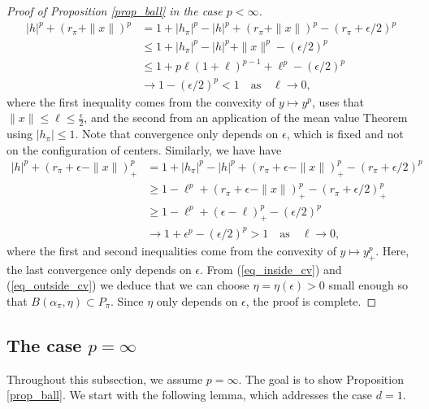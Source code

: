 \documentclass[a4paper, 11pt]{article}
\theoremstyle{plain}
\theoremstyle{definition}
\numberwithin{equation}{section}
\begin{document}
\begin{proof}[Proof of Proposition \ref{prop_ball} in the case $p<\infty$]
        \begin{equation}
            \label{eq_inside_cv}
            \begin{split}
                |h|^p+(r_\pi+\|x\|)^p&=1+|{h_\pi}|^p-|h|^p+(r_\pi+\|x\|)^p-(r_\pi+\epsilon/2)^p\\
                &\leq 1+|{h_\pi}|^p-|h|^p+\|x\|^p-(\epsilon/2)^p\\
                &\leq 1+p\ell(1+\ell)^{p-1}+\ell^p-(\epsilon/2)^p\\
                &\rightarrow 1-(\epsilon/2)^p<1 \quad\text{as}\quad \ell\rightarrow0,
            \end{split}
        \end{equation}
    where the first inequality comes from the convexity of $y\mapsto y^p$, uses that $\|x\|\leq\ell\leq\frac{\epsilon}{2}$, and the second from an application of the mean value Theorem using $|h_\pi|\leq 1$. Note that convergence only depends on $\epsilon$, which is fixed and not on the configuration of centers. Similarly, we have
    have
        \begin{equation}
            \label{eq_outside_cv}
            \begin{split}
                |h|^p+(r_\pi+\epsilon-\|x\|)_+^p &=1+|{h_\pi}|^p-|h|^p+(r_\pi+\epsilon-\|x\|)_+^p-(r_\pi+\epsilon/2)^p \\
                &\geq 1-\ell^p+(r_\pi+\epsilon-\|x\|)_+^p-(r_\pi+\epsilon/2)_+^p\\
                &\geq 1-\ell^p+(\epsilon-\ell)_+^p-(\epsilon/2)^p\\
                &\rightarrow 1+\epsilon^p-(\epsilon/2)^p>1\quad\text{as}\quad \ell\rightarrow0,
            \end{split}
        \end{equation}
    where the first and second inequalities come from the convexity of $y\mapsto y^p_+$. Here, the last convergence only depends on $\epsilon$. From (\ref{eq_inside_cv}) and (\ref{eq_outside_cv}) we deduce that we can choose $\eta=\eta(\epsilon)>0$ small enough so that $B(\alpha_\pi,\eta)\subset P_\pi$. Since $\eta$ only depends on $\epsilon$, the proof is complete.
\end{proof}


\subsection{The case $p=\infty$}


Throughout this subsection, we assume $p=\infty$. The goal is to show Proposition \ref{prop_ball}. We start with the following lemma, which addresses the case $d=1$. 
\end{document}
